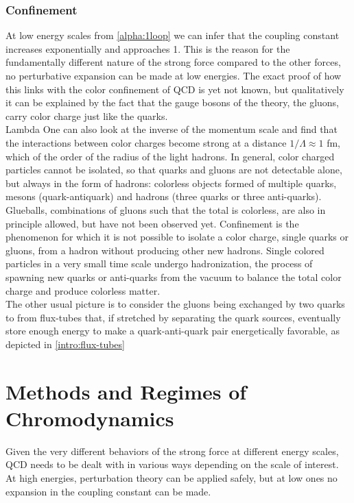 \subsubsection{Confinement}
At low energy scales from \cref{alpha:1loop} we can infer that the coupling constant increases exponentially and approaches 1. This is the reason for the fundamentally different nature of the strong force compared to the other forces, no perturbative expansion can be made at low energies. The exact proof of how this links with the color confinement of QCD is yet not known, but qualitatively it can be explained by the fact that the gauge bosons of the theory, the gluons, carry color charge just like the quarks.\\Lambda
One can also look at the inverse of the momentum scale and find that the interactions between color charges become strong at a distance $1/\Lambda \approx 1$ fm, which of the order of the radius of the light hadrons.
In general, color charged particles cannot be isolated, so that quarks and gluons are not detectable alone, but always in the form of hadrons: colorless objects formed of multiple quarks, mesons (quark-antiquark) and hadrons (three quarks or three anti-quarks). Glueballs, combinations of gluons such that the total is colorless, are also in principle allowed, but have not been observed yet. Confinement is the phenomenon for which it is not possible to isolate a color charge, single quarks or gluons, from a hadron without producing other new hadrons. Single colored particles in a very small time scale undergo hadronization, the process of spawning new quarks or anti-quarks from the vacuum to balance the total color charge and produce colorless matter. \\
The other usual picture is to consider the gluons being exchanged by two quarks to from flux-tubes that, if stretched by separating the quark sources, eventually store enough energy to make a quark-anti-quark pair energetically favorable, as depicted in \cref{intro:flux-tubes}

\section{Methods and Regimes of Chromodynamics}
Given the very different behaviors of the strong force at different energy scales, QCD needs to be dealt with in various ways depending on the scale of interest. At high energies, perturbation theory can be applied safely, but at low ones no expansion in the coupling constant can be made. 

